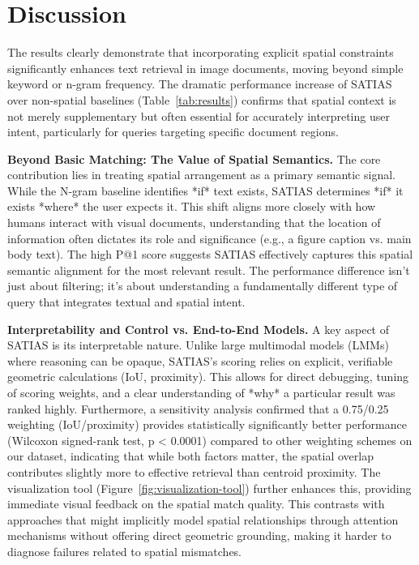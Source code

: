 \documentclass[manuscript,screen]{acmart}
\begin{document}
\section{Discussion}
\label{sec:discussion}

The results clearly demonstrate that incorporating explicit spatial constraints significantly enhances text retrieval in image documents, moving beyond simple keyword or n-gram frequency. The dramatic performance increase of SATIAS over non-spatial baselines (Table~\ref{tab:results}) confirms that spatial context is not merely supplementary but often essential for accurately interpreting user intent, particularly for queries targeting specific document regions.

\textbf{Beyond Basic Matching: The Value of Spatial Semantics.} The core contribution lies in treating spatial arrangement as a primary semantic signal. While the N-gram baseline identifies *if* text exists, SATIAS determines *if* it exists *where* the user expects it. This shift aligns more closely with how humans interact with visual documents, understanding that the location of information often dictates its role and significance (e.g., a figure caption vs. main body text). The high P@1 score suggests SATIAS effectively captures this spatial semantic alignment for the most relevant result. The performance difference isn't just about filtering; it's about understanding a fundamentally different type of query that integrates textual and spatial intent.

\textbf{Interpretability and Control vs. End-to-End Models.} A key aspect of SATIAS is its interpretable nature. Unlike large multimodal models (LMMs) \cite{Huang24, Yin24} where reasoning can be opaque, SATIAS's scoring relies on explicit, verifiable geometric calculations (IoU, proximity). This allows for direct debugging, tuning of scoring weights, and a clear understanding of *why* a particular result was ranked highly. Furthermore, a sensitivity analysis confirmed that a 0.75/0.25 weighting (IoU/proximity) provides statistically significantly better performance (Wilcoxon signed-rank test, p < 0.0001) compared to other weighting schemes on our dataset, indicating that while both factors matter, the spatial overlap contributes slightly more to effective retrieval than centroid proximity. The visualization tool (Figure~\ref{fig:visualization-tool}) further enhances this, providing immediate visual feedback on the spatial match quality. This contrasts with approaches that might implicitly model spatial relationships through attention mechanisms without offering direct geometric grounding, making it harder to diagnose failures related to spatial mismatches.
\end{document}
